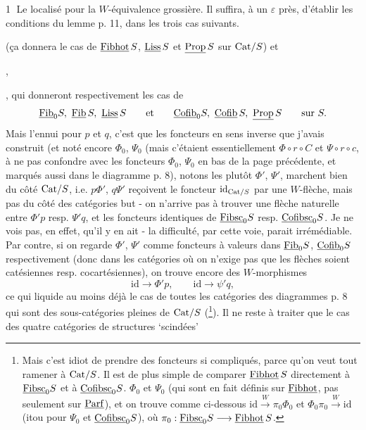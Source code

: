 \textcircled{1} Le localisé pour la $W$-équivalence grossière. Il suffira, à un $\varepsilon$ près, d'établir les conditions du lemme p. 11, dans les trois cas suivants.
(ça donnera le cas de $\underline{\mathrm{Fibhot}}\,S$, $\underline{\mathrm{Liss}}\,S$ et $\underline{\mathrm{Prop}}\,S$ sur $\mathrm{Cat}/S$) et
,
,
qui donneront respectivement les cas de
\[
\underline{\mathrm{Fib}}_0S,\ \underline{\mathrm{Fib}}\,S,\ \underline{\mathrm{Liss}}\,S \qquad \text{et} \qquad \underline{\mathrm{Cofib}}_0S,\ \underline{\mathrm{Cofib}}\,S,\ \underline{\mathrm{Prop}}\,S \qquad \text{sur } S.
\]
Mais l'ennui pour $p$ et $q$, c'est que les foncteurs en sens inverse que j'avais construit (et noté encore $\Phi_0$, $\Psi_0$ (mais c'étaient essentiellement $\Phi\circ r\circ C$ et $\Psi\circ r\circ c$, à ne pas confondre avec les foncteurs $\Phi_0$, $\Psi_0$ en bas de la page précédente, et marqués aussi dans le diagramme p. 8), notons les plutôt $\Phi'$, $\Psi'$, marchent bien du côté $\mathrm{Cat}/S$, i.e. $p\Phi'$, $q\Psi'$ reçoivent le foncteur $\mathrm{id}_{\mathrm{Cat}/S}$ par une $W$-flèche, mais pas du côté des catégories but - on n'arrive pas à trouver une flèche naturelle entre $\Phi'p$ resp. $\Psi'q$, et les foncteurs identiques de $\underline{\mathrm{Fibsc}}_0S$ resp. $\underline{\mathrm{Cofibsc}}_0S$. Je ne vois
pas, en effet, qu'il y en ait - la difficulté, par cette voie, parait irrémédiable. Par contre, si on regarde $\Phi'$, $\Psi'$ comme foncteurs à valeurs dans $\underline{\mathrm{Fib}}_0S$, $\underline{\mathrm{Cofib}}_0S$ respectivement (donc dans les catégories où on n'exige pas que les flèches soient catésiennes resp. cocartésiennes), on trouve encore des $W$-morphismes %
\[
\mathrm{id} \longrightarrow \Phi'p, \qquad \mathrm{id} \longrightarrow \psi'q, %
\]
ce qui liquide au moins déjà le cas de toutes les catégories des diagrammes p. 8 qui sont des
sous-catégories pleines de $\mathrm{Cat}/S$ (\footnote[36]{Mais c'est idiot de prendre des foncteurs si compliqués, parce qu'on veut tout ramener à $\mathrm{Cat}/S$. Il est de plus simple de comparer $\underline{\mathrm{Fibhot}}\,S$ directement à $\underline{\mathrm{Fibsc}}_0S$ et à $\underline{\mathrm{Cofibsc}}_0S$. $\Phi_0$ et $\Psi_0$ (qui sont en fait définis sur $\underline{\mathrm{Fibhot}}$, pas seulement sur $\underline{\mathrm{Parf}}$), et on trouve comme ci-dessous $\mathrm{id} \xrightarrow{W} \pi_0\Phi_0$ et $\Phi_0\pi_0 \xrightarrow{W} \mathrm{id}$ (itou pour $\Psi_0$ et $\underline{\mathrm{Cofibsc}}_0S$), où $\pi_0 : \underline{\mathrm{Fibsc}}_0S \longrightarrow \underline{\mathrm{Fibhot}}\,S$.}). Il ne reste à traiter que le cas des quatre catégories de structures `scindées'
